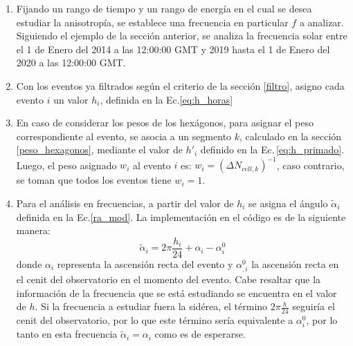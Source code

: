         \begin{enumerate}
        \item Fijando un rango de tiempo y un rango de energía en el cual se desea estudiar la anisotropía, se establece una frecuencia en particular $f$ a analizar. Siguiendo el ejemplo de la sección anterior, se analiza la frecuencia solar entre el 1 de Enero del 2014 a las 12:00:00 GMT y 2019 hasta el 1 de Enero del 2020 a las 12:00:00 GMT.

        \item Con los eventos ya filtrados según el criterio de la sección \ref{filtro}, asigno cada evento $i$ un valor $h_i$, definida en la Ec.\ref{eq:h_horas}

        \item En caso de considerar los pesos de los hexágonos, para asignar el peso correspondiente al evento, se asocia a un segmento $k$, calculado en la sección \ref{peso_hexagonos}, mediante el valor de $h'_i$ definido en la Ec.\,\ref{eq:h_primado}. Luego, el peso asignado $w_i$  al evento $i$ es: $ w_{i}= (\Delta N_{cell,k})^{-1}$, caso contrario, se toman que todos los eventos tiene $w_i=1$.
        
        \item Para el análisis en frecuencias, a partir del valor de $h_i$ se asigna el ángulo $\tilde{\alpha}_i$ definida en la Ec.\ref{ra_mod}. La implementación en el código es de la siguiente manera: 
        \begin{equation}
         \tilde{\alpha}_i = 2\pi \frac{h_i}{24} + \alpha_i -\alpha^0_{i}
        \end{equation}
        donde $\alpha_i$  representa la ascensión recta del evento y $\alpha^0_{,i}$ la ascensión recta en el cenit del observatorio en el momento del evento. Cabe resaltar que la información de la frecuencia que se está estudiando se encuentra en el valor de $h$. Si la frecuencia a estudiar fuera la sidérea, el término $2\pi \frac{h}{24} $ seguiría el cenit del observatorio, por lo que este término sería equivalente a $\alpha^0_{i}$, por lo tanto en esta frecuencia $ \tilde{\alpha}_i =\alpha_i$ como es de esperarse. 
        

\end{enumerate}
